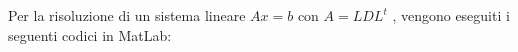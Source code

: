 Per la risoluzione di un sistema lineare $Ax=b$ con $A=LDL^t$ , vengono eseguiti i seguenti codici in MatLab:



